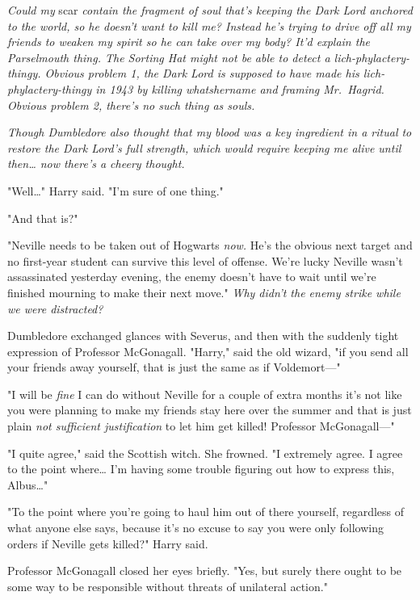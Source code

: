 \emph{Could my} scar\emph{ contain the fragment of soul that's keeping the Dark 
Lord anchored to the world, so he doesn't want to kill me? Instead he's trying 
to drive off all my friends to weaken my spirit so he can take over my body? 
It'd explain the Parselmouth thing. The Sorting Hat might not be able to detect 
a lich-phylactery-thingy. Obvious problem 1, the Dark Lord is supposed to have 
made his lich-phylactery-thingy in 1943 by killing whatshername and framing 
Mr.~Hagrid. Obvious problem 2, there's no such thing as souls.}

\emph{Though Dumbledore also thought that my blood was a key ingredient in a 
ritual to restore the Dark Lord's full strength, which would require keeping me 
alive until then{\ldots} now there's a cheery thought.}

"Well{\ldots}" Harry said. "I'm sure of one thing."

"And that is?"

"Neville needs to be taken out of Hogwarts \emph{now.} He's the obvious next 
target and no first-year student can survive this level of offense. We're lucky 
Neville wasn't assassinated yesterday evening, the enemy doesn't have to wait 
until we're finished mourning to make their next move." \emph{Why didn't the 
enemy strike while we were distracted?}

Dumbledore exchanged glances with Severus, and then with the suddenly tight 
expression of Professor McGonagall. "Harry," said the old wizard, "if you send 
all your friends away yourself, that is just the same as if Voldemort---"

"I will be \emph{fine} I can do without Neville for a couple of extra months 
it's not like you were planning to make my friends stay here over the summer 
and that is just plain \emph{not sufficient justification} to let him get 
killed! Professor McGonagall---"

"I quite agree," said the Scottish witch. She frowned. "I extremely agree. I 
agree to the point where{\ldots} I'm having some trouble figuring out how to 
express this, Albus{\ldots}"

"To the point where you're going to haul him out of there yourself, regardless 
of what anyone else says, because it's no excuse to say you were only following 
orders if Neville gets killed?" Harry said.

Professor McGonagall closed her eyes briefly. "Yes, but surely there ought to 
be some way to be responsible without threats of unilateral action."

